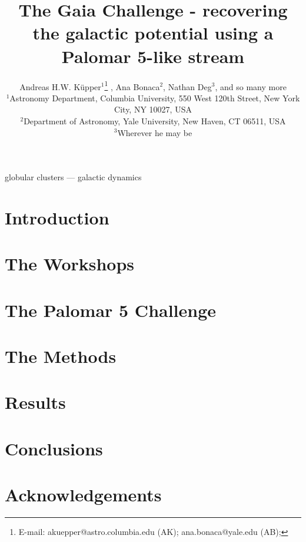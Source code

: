 \documentclass[useAMS,usenatbib, a4paper]{mn2e}
\title[Gaia Challenge - Palomar 5]{The Gaia Challenge - recovering the galactic potential using a Palomar
5-like stream}
\author[K\"upper et al.]
{Andreas H.W. K\"{u}pper$^{1}$\thanks{
E-mail: \mbox{akuepper@astro.columbia.edu} (AK);
 \mbox{ana.bonaca@yale.edu} (AB);}
, Ana Bonaca$^{2}$, Nathan Deg$^{3}$, and so many more\\
$^{1}$Astronomy Department, Columbia University, 550 West 120th Street, New York City, NY 10027, USA\\
$^{2}$Department of Astronomy, Yale University, New Haven, CT 06511, USA\\
$^{3}$Wherever he may be\\
}
\begin{document}


\maketitle

\label{firstpage}

\begin{abstract}

\end{abstract}




\begin{keywords}
globular clusters --- galactic dynamics
\end{keywords}





\section{Introduction}



\section{The Workshops}



\section{The Palomar 5 Challenge}



\section{The Methods}



\section{Results}



\section{Conclusions}



\section*{Acknowledgements}


\begin{thebibliography}{99}

\end{thebibliography}



\bsp \label{lastpage} 
\end{document}
